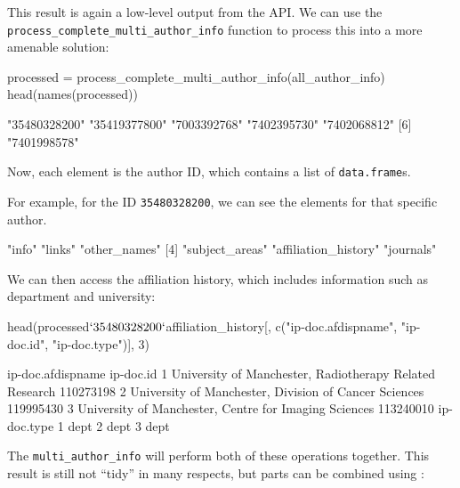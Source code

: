 This result is again a low-level output from the API. We can use the
\texttt{process\_complete\_multi\_author\_info} function to process this
into a more amenable solution:

\begin{Schunk}
\begin{Sinput}
processed = process_complete_multi_author_info(all_author_info)
head(names(processed))
\end{Sinput}
\begin{Soutput}
[1] "35480328200" "35419377800" "7003392768"  "7402395730"  "7402068812" 
[6] "7401998578" 
\end{Soutput}
\end{Schunk}

Now, each element is the author ID, which contains a list of
\texttt{data.frame}s.

For example, for the ID \texttt{35480328200}, we can see the elements
for that specific author.

\begin{Schunk}
\begin{Soutput}
[1] "info"                "links"               "other_names"        
[4] "subject_areas"       "affiliation_history" "journals"           
\end{Soutput}
\end{Schunk}

We can then access the affiliation history, which includes information
such as department and university:

\begin{Schunk}
\begin{Sinput}
head(processed$`35480328200`$affiliation_history[, c("ip-doc.afdispname", "ip-doc.id", "ip-doc.type")], 3)
\end{Sinput}
\begin{Soutput}
                                        ip-doc.afdispname ip-doc.id
1 University of Manchester, Radiotherapy Related Research 110273198
2   University of Manchester, Division of Cancer Sciences 119995430
3   University of Manchester, Centre for Imaging Sciences 113240010
  ip-doc.type
1        dept
2        dept
3        dept
\end{Soutput}
\end{Schunk}

The \texttt{multi\_author\_info} will perform both of these operations
together. This result is still not ``tidy'' \citep{wickham2014tidy} in
many respects, but parts can be combined using 
\citep{purrr}:

